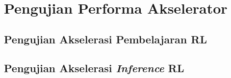 \section{Pengujian Performa Akselerator}
\label{sec:pengujian-performa-akselerator}


\subsection{Pengujian Akselerasi Pembelajaran \acl{RL}}

\subsection{Pengujian Akselerasi \textit{Inference} \acl{RL}}
